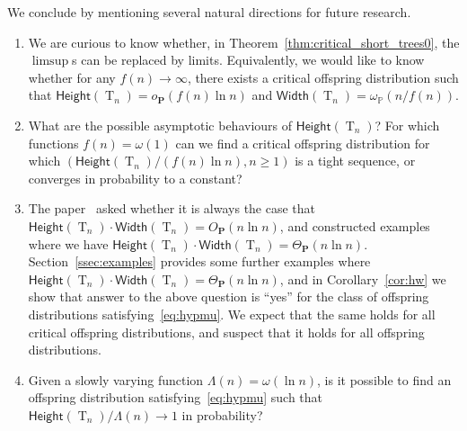 \documentclass[AHL,Unicode,longabstracts,published]{cedram}
\renewcommand{\P}{\mathbb{P}}
\renewcommand{\H}{\mathsf{Height}}
\newcommand{\p}{\mathbf{P}}
\newcommand{\Width}{\mathsf{Width}}
\DeclareMathOperator{\rtree}{T}
\begin{document}
We conclude by mentioning several natural directions for future research.
\begin{enumerate}
\item We are curious to know whether, in Theorem~\ref{thm:critical_short_trees0}, the $\limsup$s can be replaced by limits. Equivalently, we would like to know whether for any $f(n) \to \infty$, there exists a critical offspring distribution such that $\H(\rtree_n)=o_{\p}(f(n)\ln n)$ and $\Width(\rtree_n)=\omega_{\P}(n/f(n))$.
\item What are the possible asymptotic behaviours of $\H(\rtree_n)$? For which functions $f(n)=\omega(1)$ can we find a critical offspring distribution for which $(\H(\rtree_n)/(f(n)\ln n),n \ge 1)$ is a tight sequence, or converges in probability to a constant?
\item The paper~\cite{Add19} asked whether it is always the case that $\H(\rtree_n)\cdot \Width(\rtree_n)=O_{\p}(n\ln n)$, and constructed examples where we have $\H(\rtree_n)\cdot \Width(\rtree_n)=\Theta_{\p}(n\ln n)$. Section~\ref{ssec:examples} provides some further examples where $\H(\rtree_n)\cdot \Width(\rtree_n)=\Theta_{\p}(n\ln n)$, and in Corollary~\ref{cor:hw} we show that answer to the above question is ``yes'' for the class of offspring distributions satisfying~\eqref{eq:hypmu}. We expect that the same holds for all critical offspring distributions, and suspect that it holds for all offspring distributions.
\item Given a slowly varying function $\Lambda(n)=\omega(\ln n)$, is it possible to find an offspring distribution satisfying~\eqref{eq:hypmu} such that $\H(\rtree_{n})/\Lambda(n) \rightarrow 1$ in probability?
\end{enumerate}




\end{document}
